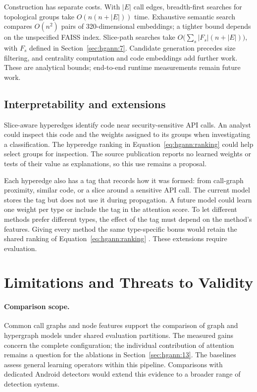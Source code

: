 Construction has separate costs. With $\lvert E \rvert$ call edges, breadth-first searches
for topological groups take $O(n(n+\lvert E\rvert))$ time. Exhaustive semantic search compares
$O(n^2)$ pairs of 320-dimensional embeddings; a tighter bound depends on the unspecified FAISS
index. Slice-path searches take
$O\bigl(\sum_s\lvert F_s\rvert(n+\lvert E\rvert)\bigr)$, with $F_s$ defined in
Section~\ref{sec:hgann:7}. Candidate generation precedes size filtering, and centrality
computation and code embeddings add further work. These are analytical bounds; end-to-end
runtime measurements remain future work.

\subsection*{Interpretability and extensions}

Slice-aware hyperedges identify code near security-sensitive API calls. An analyst could
inspect this code and the weights assigned to its groups when investigating a classification.
The hyperedge ranking in Equation~\ref{eq:hgann:ranking} could help select groups for
inspection. The source publication reports no learned weights or tests of their value as
explanations, so this use remains a proposal.

Each hyperedge also has a tag that records how it was formed: from call-graph proximity,
similar code, or a slice around a sensitive API call. The current model stores the tag but
does not use it during propagation. A future model could learn one weight per type or include
the tag in the attention score. To let different methods prefer different types, the effect
of the tag must depend on the method's features. Giving every method the same type-specific
bonus would retain the shared ranking of Equation~\ref{eq:hgann:ranking}
\cite{brody2022gatv2}. These extensions require evaluation.

\section{Limitations and Threats to Validity}
\label{sec:hgann:14}

\paragraph{Comparison scope.} Common call graphs and node features support the comparison of
graph and hypergraph models under shared evaluation partitions. The measured gains concern
the complete \hgann{} configuration; the individual contribution of attention remains a
question for the ablations in Section~\ref{sec:hgann:13}. The baselines assess general learning
operators within this pipeline. Comparisons with dedicated Android detectors would extend
this evidence to a broader range of detection systems.

